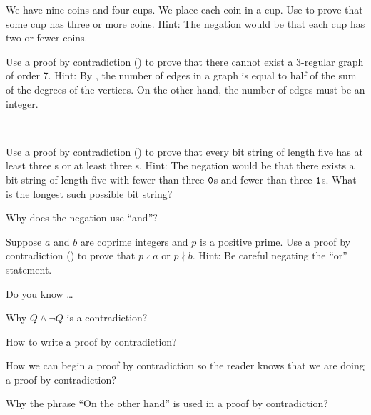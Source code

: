 \begin{exer}[\exerP] %
\label{exer_contradiction_coins_in_cups}
    We have nine coins and four cups. We place each coin in a cup. Use  to prove that some cup has three or more coins.  Hint: The negation would be that each cup has two or fewer coins.
\end{exer}

\begin{exer}[\exerP] %
\label{exer_contradiction_3reg_graph_order7}
    Use a proof by contradiction () to prove that there cannot exist a 3-regular graph of order 7. Hint: By , the number of edges in a graph is equal to half of the sum of the degrees of the vertices. On the other hand, the number of edges must be an integer.
\end{exer}

\begin{exer}[\exerU] %
\label{exer_prove_bs_length5_three0s_or_three1s}
~
    \begin{exerpart}
        \item Use a proof by contradiction () to prove that every bit string of length five has at least three s or at least three s.  Hint: The negation would be that there exists a bit string of length five with fewer than three $\texttt{0}$s and fewer than three $\texttt{1}$s. What is the longest such possible bit string?
        \item Why does the negation use ``and''?
    \end{exerpart}
\end{exer} 

\begin{exer}[\exerU] %
\label{exer_contradiction_coprime}
     Suppose $a$ and $b$ are coprime integers and $p$ is a positive prime. Use a proof by contradiction () to prove that $p \nmid a$ or $p \nmid b$. Hint: Be careful negating the ``or'' statement.
\end{exer}

\begin{exer}[\exerR] %
\label{exer_dyk_pff_contradiction}
    Do you know \ldots
        \begin{exerpart}
            \item Why $Q \land \neg Q$ is a contradiction?
            \item How to write a proof by contradiction?
            \item How we can begin a proof by contradiction so the reader knows that we are doing a proof by contradiction?
            \item Why the phrase ``On the other hand'' is used in a proof by contradiction?
        \end{exerpart}
\end{exer}

